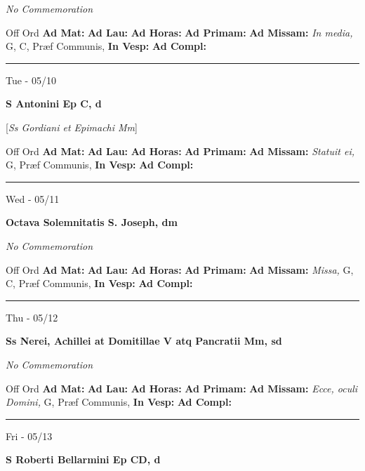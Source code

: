 \documentclass[letterpaper, 10pt]{article}
\begin{document}
\textit{No Commemoration}\begin{justify}
Off Ord
\textbf{Ad Mat: }
\textbf{Ad Lau: }
\textbf{Ad Horas: }
\textbf{Ad Primam: }
\textbf{Ad Missam:} \textit{In media, } G, C, Præf Communis, 
\textbf{In Vesp: }
\textbf{Ad Compl: }\end{justify}



\hrule
\begin{center}
Tue - 05/10
\end{center}\textbf{ \large S Antonini Ep C, \textnormal{\normalsize d}}

[\textit{Ss Gordiani et Epimachi Mm}]
\begin{justify}
Off Ord
\textbf{Ad Mat: }
\textbf{Ad Lau: }
\textbf{Ad Horas: }
\textbf{Ad Primam: }
\textbf{Ad Missam:} \textit{Statuit ei, } G, Præf Communis, 
\textbf{In Vesp: }
\textbf{Ad Compl: }\end{justify}



\hrule
\begin{center}
Wed - 05/11
\end{center}\textbf{ \large Octava Solemnitatis S. Joseph, \textnormal{\normalsize dm}}

\textit{No Commemoration}\begin{justify}
Off Ord
\textbf{Ad Mat: }
\textbf{Ad Lau: }
\textbf{Ad Horas: }
\textbf{Ad Primam: }
\textbf{Ad Missam:} \textit{Missa, } G, C, Præf Communis, 
\textbf{In Vesp: }
\textbf{Ad Compl: }\end{justify}



\hrule
\begin{center}
Thu - 05/12
\end{center}\textbf{ \large Ss Nerei, Achillei at Domitillae V atq Pancratii Mm, \textnormal{\normalsize sd}}

\textit{No Commemoration}\begin{justify}
Off Ord
\textbf{Ad Mat: }
\textbf{Ad Lau: }
\textbf{Ad Horas: }
\textbf{Ad Primam: }
\textbf{Ad Missam:} \textit{Ecce, oculi Domini, } G, Præf Communis, 
\textbf{In Vesp: }
\textbf{Ad Compl: }\end{justify}



\hrule
\begin{center}
Fri - 05/13
\end{center}\textbf{ \large S Roberti Bellarmini Ep CD, \textnormal{\normalsize d}}
\end{document}
